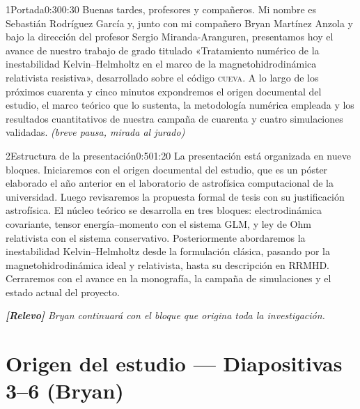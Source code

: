 \documentclass[11pt,a4paper]{article}
\newcommand{\relevo}[1]{%
  \par\medskip
  \noindent\colorbox{tagbg}{\parbox{\dimexpr\linewidth-2\fboxsep\relax}{%
    \small\itshape \textbf{[Relevo]} #1}}\par\medskip}
\newcommand{\escena}[1]{\textit{\textcolor{neutral!70!white}{(#1)}}}
\begin{document}
\begin{seborador}{1}{Portada}{0:30}{0:30}
Buenas tardes, profesores y compañeros. Mi nombre es Sebastián Rodríguez
García y, junto con mi compañero Bryan Martínez Anzola y bajo la dirección
del profesor Sergio Miranda-Aranguren, presentamos hoy el avance de nuestro
trabajo de grado titulado «Tratamiento numérico de la inestabilidad
Kelvin--Helmholtz en el marco de la magnetohidrodinámica relativista
resistiva», desarrollado sobre el código \textsc{cueva}. A lo largo de los
próximos cuarenta y cinco minutos expondremos el origen documental del
estudio, el marco teórico que lo sustenta, la metodología numérica empleada
y los resultados cuantitativos de nuestra campaña de cuarenta y cuatro
simulaciones validadas. \escena{breve pausa, mirada al jurado}
\end{seborador}

\begin{seborador}{2}{Estructura de la presentación}{0:50}{1:20}
La presentación está organizada en nueve bloques. Iniciaremos con el origen
documental del estudio, que es un póster elaborado el año anterior en el
laboratorio de astrofísica computacional de la universidad. Luego revisaremos
la propuesta formal de tesis con su justificación astrofísica. El núcleo
teórico se desarrolla en tres bloques: electrodinámica covariante, tensor
energía--momento con el sistema GLM, y ley de Ohm relativista con el sistema
conservativo. Posteriormente abordaremos la inestabilidad Kelvin--Helmholtz
desde la formulación clásica, pasando por la magnetohidrodinámica ideal y
relativista, hasta su descripción en RRMHD. Cerraremos con el avance en la
monografía, la campaña de simulaciones y el estado actual del proyecto.
\relevo{Bryan continuará con el bloque que origina toda la investigación.}
\end{seborador}

\section{Origen del estudio --- Diapositivas 3--6 (Bryan)}
\end{document}
